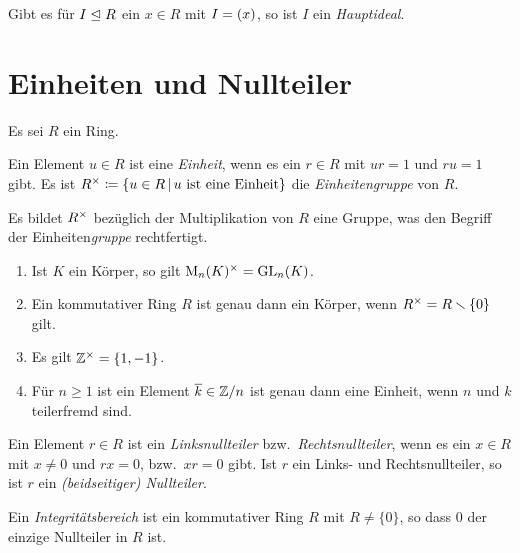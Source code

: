 \begin{definition}
  Gibt es für $I \mathrel{\trianglelefteq} R$ ein $x \in R$ mit $I = (x)$, so ist $I$ ein \emph{Hauptideal}.
\end{definition}





\section{Einheiten und Nullteiler}

Es sei $R$ ein Ring.

\begin{definition}
  Ein Element $u \in R$ ist eine \emph{Einheit}, wenn es ein $r \in R$ mit $ur = 1$ und $ru = 1$ gibt.
  Es ist
  $
              \unitgroup{R}
    \defined  \{
                u \in R
              \suchthat 
                \text{$u$ ist eine Einheit}
              \}
  $
  die \emph{Einheitengruppe} von $R$.
\end{definition}

Es bildet $R^{\times}$ bezüglich der Multiplikation von $R$ eine Gruppe, was den Begriff der Einheiten\emph{gruppe} rechtfertigt.

\begin{example}
  \begin{enumerate}
    \item
      Ist $K$ ein Körper, so gilt $\operatorname{M}_{n}(K)^{\times} = \operatorname{GL}_{n}(K)$.
    \item
      Ein kommutativer Ring $R$ ist genau dann ein Körper, wenn $R^{\times} = R \smallsetminus \{0\}$ gilt.
    \item
      Es gilt $\mathbb{Z}^{\times} = \{1, -1\}$.
    \item
      Für $n \geq 1$ ist ein Element $\overline{k} \in \mathbb{Z}/n$ ist genau dann eine Einheit, wenn $n$ und $k$ teilerfremd sind.
  \end{enumerate}
\end{example}

\begin{definition}
  Ein Element $r \in R$ ist ein \emph{Linksnullteiler} bzw.\ \emph{Rechtsnullteiler}, wenn es ein $x \in R$ mit $x \neq 0$ und $rx = 0$, bzw.\ $xr = 0$ gibt.
  Ist $r$ ein Links- und Rechtsnullteiler, so ist $r$ ein \emph{\textup(beidseitiger\textup) Nullteiler}.
\end{definition}

\begin{definition}
  Ein \emph{Integritätsbereich} ist ein kommutativer Ring $R$ mit $R \neq \{0\}$, so dass $0$ der einzige Nullteiler in $R$ ist.
\end{definition}






